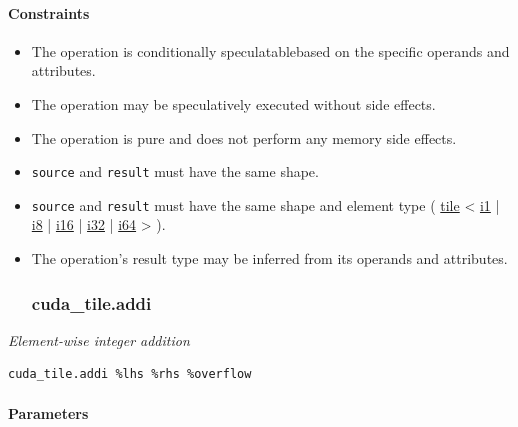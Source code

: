 \documentclass{article}
\begin{document}
\paragraph{Constraints}

\begin{itemize}
\item The operation is conditionally speculatablebased on the specific operands and attributes.
\item The operation may be speculatively executed without side effects.
\item The operation is pure and does not perform any memory side effects.
\item \texttt{source} and \texttt{result} must have the same shape.
\item \texttt{source} and \texttt{result} must have the same shape and element type ( \href{https://docs.nvidia.com/cuda/tile-ir/latest/sections/types.html#type-tile}{tile} < \href{https://docs.nvidia.com/cuda/tile-ir/latest/sections/types.html#subsection-element-types}{i1} | \href{https://docs.nvidia.com/cuda/tile-ir/latest/sections/types.html#subsection-element-types}{i8} | \href{https://docs.nvidia.com/cuda/tile-ir/latest/sections/types.html#subsection-element-types}{i16} | \href{https://docs.nvidia.com/cuda/tile-ir/latest/sections/types.html#subsection-element-types}{i32} | \href{https://docs.nvidia.com/cuda/tile-ir/latest/sections/types.html#subsection-element-types}{i64} > ).
\item The operation's result type may be inferred from its operands and attributes.


\subsubsection{cuda\_tile.addi}

\end{itemize}
\textit{Element-wise integer addition}


\begin{lstlisting}
cuda_tile.addi %lhs %rhs %overflow
\end{lstlisting}

\paragraph{Parameters}
\end{document}
